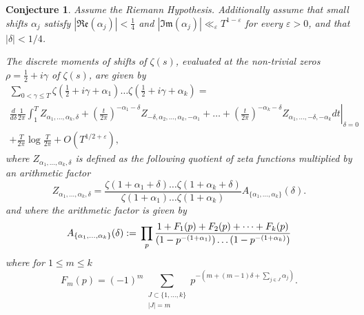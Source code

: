 \documentclass[12pt,a4paper,reqno]{amsart}
\newtheorem{conjecture}{Conjecture}
\theoremstyle{remark}
\numberwithin{equation}{section}
\renewcommand{\Re}{\mathfrak{Re}}
\renewcommand{\Im}{\mathfrak{Im}}
\begin{document}
\begin{conjecture}\label{RatioMom}
Assume the Riemann Hypothesis. Additionally assume that small shifts $\alpha_j$ satisfy $|\Re(\alpha_j)| < \frac{1}{4}$ and $|\Im(\alpha_j)| \ll_\varepsilon T^{1-\varepsilon}$ for every $\varepsilon > 0$, and that $|\delta|<1/4$.

The discrete moments of shifts of $\zeta (s)$, evaluated at the non-trivial zeros $\rho = \frac{1}{2} + i \gamma$ of $\zeta (s)$, are given by
\begin{multline}\label{eq:ZRatios}
\sum_{0 < \gamma \leq T}  \zeta \left( \frac{1}{2} + i \gamma + \alpha_1 \right)\dots\zeta \left( \frac{1}{2} + i \gamma + \alpha_k \right) = \\
 \left. \frac{d}{d \delta} \frac{1}{2 \pi} \int_{1}^{T} Z_{\alpha_1,\dots,\alpha_k,\delta} + \left( \frac{t}{2 \pi} \right)^{-\alpha_1 - \delta} Z_{-\delta, \alpha_2,\dots,\alpha_k,-\alpha_1} +\dots + \left( \frac{t}{2 \pi} \right)^{-\alpha_k - \delta} Z_{ \alpha_1,\dots,-\delta, -\alpha_k} dt  \right|_{\delta=0} \\
+ \frac{T}{2\pi} \log \frac{T}{2\pi} + O\left(T^{1/2 +\varepsilon}\right),
\end{multline}
where $Z_{\alpha_1,\dots,\alpha_k,\delta}$ is defined as the following quotient of zeta functions multiplied by an arithmetic factor
\[
 Z_{\alpha_1,\dots,\alpha_k,\delta} = \frac{  \zeta (1+\alpha_1 + \delta)  \dots \zeta (1+\alpha_k +\delta)}{\zeta (1+\alpha_1)  \dots \zeta (1+\alpha_k)} A_{\{\alpha_1,\dots,\alpha_k\}}(\delta).
\]
and where the arithmetic factor is given by
\begin{equation}\label{eq:A}
    A_{\{\alpha_1,\dots,\alpha_k\}}(\delta) := \\
    \prod_p \frac{ 1 + F_1(p) + F_2(p) + \dots + F_k(p)}{(1-p^{-(1+\alpha_1)})\dots(1-p^{-(1+\alpha_k)})}
\end{equation}
where for $1\leq m\leq k$
\[
F_m(p) = (-1)^m \sum_{\substack{J \subset\{1,\dots,k\} \\ |J|=m}} p^{-\left(m +(m-1)\delta + \sum_{j \in J} \alpha_j \right)}.
\]
\end{conjecture}
\end{document}
